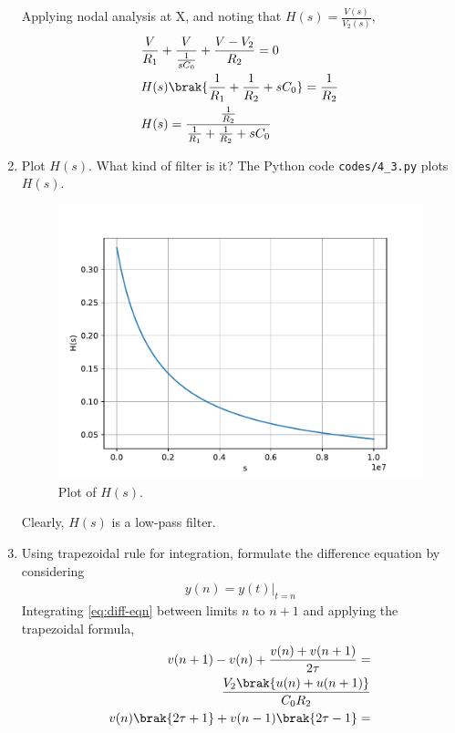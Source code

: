 \documentclass[journal,12pt,twocolumn]{IEEEtran}
\renewcommand\thesection{\arabic{section}}
\begin{document}
\begin{enumerate}[label=\arabic*.,ref=\thesection.\theenumi]
\begin{figure}[!htb]
\begin{center}
    \end{center}
\caption{}
\label{fig:sckt-q4}
\end{figure}
Applying nodal analysis at X, and noting that 
$H(s) = \frac{V(s)}{V_2(s)}$,
\begin{align}
    &\frac{V}{R_1} + \frac{V}{\frac{1}{sC_0}} + \frac{V - V_2}{R_2} = 0 \\
    &H(s)\brak{\frac{1}{R_1} + \frac{1}{R_2} + sC_0} = \frac{1}{R_2} \\
    &H(s) = \frac{\frac{1}{R_2}}{\frac{1}{R_1} + \frac{1}{R_2} + sC_0}
    \label{eq:Hs}
\end{align}
\item Plot $H(s)$. What kind of filter is it?
\solution The Python code \texttt{codes/4\_3.py} plots $H(s)$.
\begin{figure}[!ht]
    \includegraphics[width=\columnwidth]{figs/4_3.pdf}
    \caption{Plot of $H(s)$.}
    \label{fig:Hs}
\end{figure}
Clearly, $H(s)$ is a low-pass filter.
\item Using trapezoidal rule for integration, formulate the difference
equation by considering 
\begin{align}
	y(n) = y(t)\vert_{t=n}
\end{align}
\solution Integrating \eqref{eq:diff-eqn} between limits $n$ to $n+1$ 
and applying the trapezoidal formula,
\begin{align}
    v(n+1) - v(n) + \frac{v(n) + v(n+1)}{2\tau} = \nonumber\\
    \frac{V_2\brak{u(n)+u(n+1)}}{C_0R_2} \\
    v(n)\brak{2\tau+1} + v(n-1)\brak{2\tau-1} = \nonumber\\ 

\end{align}
\end{enumerate}
\end{document}
